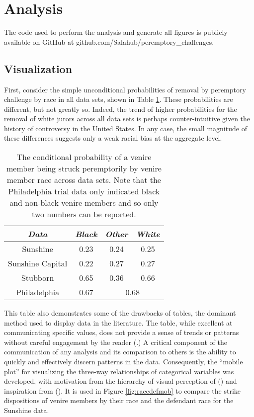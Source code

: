 \section{Analysis} \label{c:analysis}

The \R code used to perform the analysis and generate all
figures is publicly available on GitHub at github.com/Salahub/peremptory\_challenges.

\subsection{Visualization} \label{sec:visual}

First, consider the simple unconditional probabilities of
removal by peremptory challenge by race in all data sets, shown in
Table \ref{tab:margrace}. These probabilities are different, but not greatly so. Indeed, the trend of higher probabilities for the removal of white jurors
across all data sets is perhaps counter-intuitive given the history of controversy in the United States. In any case, the small
magnitude of these differences suggests only a weak racial bias at the aggregate level.

\begin{table}[h!]
  \centering
  \caption[Strike Rate by Race]{\footnotesize The conditional probability of a venire member being struck peremptorily by venire member race across data sets. Note that the Philadelphia trial data only
    indicated black and non-black venire members and so only two numbers can be reported.} \label{tab:margrace}
  \begin{tabular}{|c|c c c|} \hline
    \textit{Data} & \textit{Black} & \textit{Other} & \textit{White} \\ \hline
    Sunshine & 0.23 & 0.24 & 0.25 \\
    Sunshine Capital & 0.22 & 0.27 & 0.27 \\
    Stubborn & 0.65 & 0.36 & 0.66 \\ 
    Philadelphia & 0.67 & \multicolumn{2}{c|}{0.68} \\ \hline
  \end{tabular}
\end{table}

This table also demonstrates some of the drawbacks of tables, the
dominant method used to display data in the literature. The table, while excellent at communicating specific
values, does not provide a sense of trends or patterns without careful
engagement by the reader (\cite{tukeywilk1966}.) A critical component of the
communication of any analysis and its comparison to others is the ability to quickly and effectively discern patterns in the data. Consequently, the ``mobile plot'' for visualizing the three-way relationships of categorical variables was
developed, with motivation from the hierarchy of visual perception of
(\cite{cleveland1987}) and inspiration from
(\cite{VisualDisplayQuant}). It is used in Figure \ref{fig:racedefmob}
to compare the strike dispositions of venire members by their race and the defendant race for the Sunshine data.

